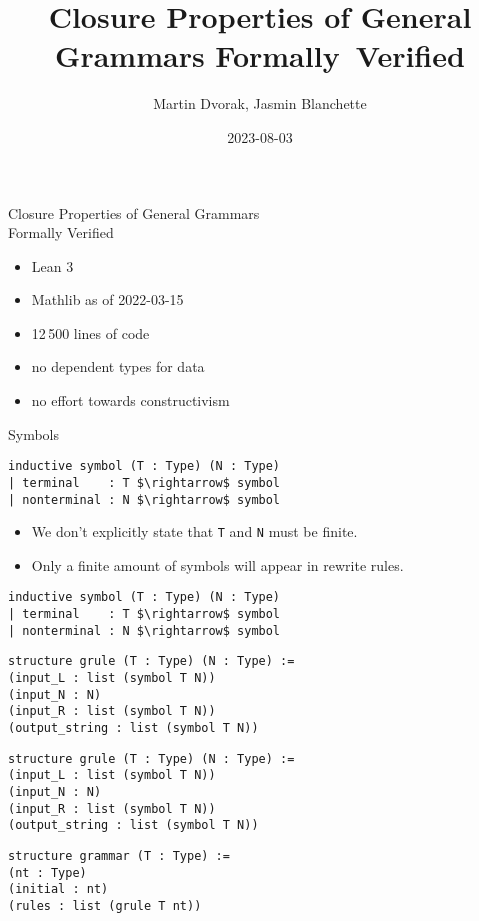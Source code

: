 \documentclass{beamer}
\title{Closure Properties of General Grammars Formally~Verified}
\author{Martin Dvorak, Jasmin Blanchette}
\date{2023-08-03}
\begin{document}
	
	\begin{frame}[plain]
		\maketitle
	\end{frame}
	
	\begin{frame}{Closure Properties of General Grammars\\Formally Verified}
		\begin{itemize}
			\item Lean 3
			\item Mathlib as of 2022-03-15
			\item 12\,500 lines of code
			\item no dependent types for data
			\item no effort towards constructivism
		\end{itemize}
	\end{frame}
	
	\begin{frame}[fragile]{Symbols}
\begin{lstlisting}
inductive symbol (T : Type) (N : Type)
| terminal    : T $\rightarrow$ symbol
| nonterminal : N $\rightarrow$ symbol
\end{lstlisting}
		\bigskip
		\pause
		\begin{itemize}
			\item We don't explicitly state that \texttt{T} and \texttt{N} must be finite.
			\item Only a finite amount of symbols will appear in rewrite rules.
		\end{itemize}
	\end{frame}

	\begin{frame}[fragile]{\only<2->{Rules}}
\begin{lstlisting}
inductive symbol (T : Type) (N : Type)
| terminal    : T $\rightarrow$ symbol
| nonterminal : N $\rightarrow$ symbol
\end{lstlisting}
\pause
\begin{lstlisting}
structure grule (T : Type) (N : Type) :=
(input_L : list (symbol T N))
(input_N : N)
(input_R : list (symbol T N))
(output_string : list (symbol T N))
\end{lstlisting}
	\end{frame}
	
	\begin{frame}[fragile]{\only<2->{Grammars}}
\begin{lstlisting}
structure grule (T : Type) (N : Type) :=
(input_L : list (symbol T N))
(input_N : N)
(input_R : list (symbol T N))
(output_string : list (symbol T N))
\end{lstlisting}
\pause
\begin{lstlisting}
structure grammar (T : Type) :=
(nt : Type)
(initial : nt)
(rules : list (grule T nt))
\end{lstlisting}
	\end{frame}
	
\end{document}
